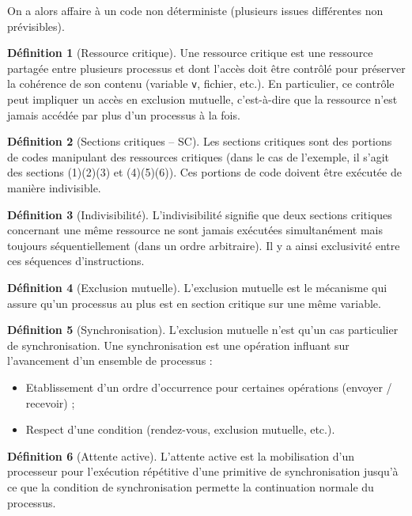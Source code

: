 \documentclass[11pt,english,french]{scrreprt}
\theoremstyle{remark}
\theoremstyle{definition}
\newtheorem*{def*}{Définition}
\begin{document}
On a alors affaire à un code non déterministe (plusieurs issues différentes non prévisibles).

\begin{def*}[Ressource critique]
	Une ressource critique est une ressource partagée entre plusieurs processus et dont l'accès doit être contrôlé pour préserver la cohérence de son contenu (variable \lstinline!v!, fichier, etc.). En particulier, ce contrôle peut impliquer un accès en exclusion mutuelle, c'est-à-dire que la ressource n'est jamais accédée par plus d'un processus à la fois.
\end{def*}

\begin{def*}[Sections critiques -- SC]
	Les sections critiques sont des portions de codes manipulant des ressources critiques (dans le cas de l'exemple, il s'agit des sections (1)(2)(3) et (4)(5)(6)). Ces portions de code doivent être exécutée de manière indivisible.
\end{def*}

\begin{def*}[Indivisibilité]
	L'indivisibilité signifie que deux sections critiques concernant une même ressource ne sont jamais exécutées simultanément mais toujours séquentiellement (dans un ordre arbitraire). Il y a ainsi exclusivité entre ces séquences d'instructions.
\end{def*}

\begin{def*}[Exclusion mutuelle]
	L'exclusion mutuelle est le mécanisme qui assure qu'un processus au plus est en section critique sur une même variable.
\end{def*}

\begin{def*}[Synchronisation]
	L'exclusion mutuelle n'est qu'un cas particulier de synchronisation. Une synchronisation est une opération influant sur l'avancement d'un ensemble de processus :\begin{itemize}
		\item Etablissement d'un ordre d'occurrence pour certaines opérations (envoyer / recevoir) ;
		\item Respect d'une condition (rendez-vous, exclusion mutuelle, etc.).
	\end{itemize}
\end{def*}

\begin{def*}[Attente active]
	L'attente active est la mobilisation d'un processeur pour l'exécution répétitive d'une primitive de synchronisation jusqu'à ce que la condition de synchronisation permette la continuation normale du processus.
\end{def*}
\end{document}
